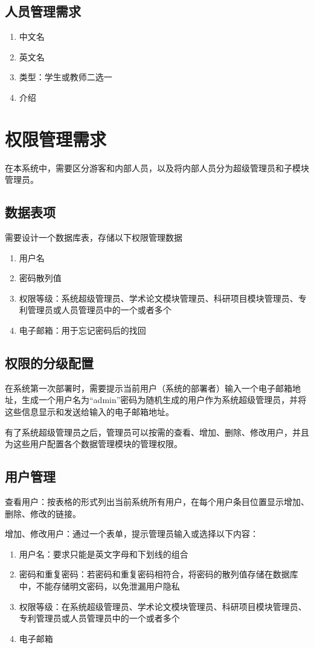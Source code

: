 \subsection{人员管理需求}

\begin{enumerate}
\item 中文名
\item 英文名
\item 类型：学生或教师二选一
\item 介绍
\end{enumerate}

\section{权限管理需求}

在本系统中，需要区分游客和内部人员，以及将内部人员分为超级管理员和子模块管理员。

\subsection{数据表项}
需要设计一个数据库表，存储以下权限管理数据

\begin{enumerate}
\item 用户名
\item 密码散列值
\item 权限等级：系统超级管理员、学术论文模块管理员、科研项目模块管理员、专利管理员或人员管理员中的一个或者多个
\item 电子邮箱：用于忘记密码后的找回
\end{enumerate}

\subsection{权限的分级配置}

在系统第一次部署时，需要提示当前用户（系统的部署者）输入一个电子邮箱地址，生成一个用户名为“admin”密码为随机生成的用户作为系统超级管理员，并将这些信息显示和发送给输入的电子邮箱地址。

有了系统超级管理员之后，管理员可以按需的查看、增加、删除、修改用户，并且为这些用户配置各个数据管理模块的管理权限。

\subsection{用户管理}

查看用户：按表格的形式列出当前系统所有用户，在每个用户条目位置显示增加、删除、修改的链接。

增加、修改用户：通过一个表单，提示管理员输入或选择以下内容：

\begin{enumerate}
\item 用户名：要求只能是英文字母和下划线的组合
\item 密码和重复密码：若密码和重复密码相符合，将密码的散列值存储在数据库中，不能存储明文密码，以免泄漏用户隐私
\item 权限等级：在系统超级管理员、学术论文模块管理员、科研项目模块管理员、专利管理员或人员管理员中的一个或者多个
\item 电子邮箱
\end{enumerate}

